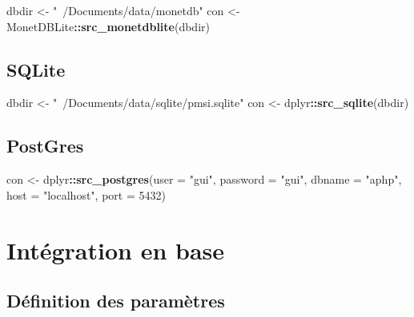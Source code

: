 \documentclass[]{book}
\newenvironment{Shaded}{\begin{snugshade}}{\end{snugshade}}
\newcommand{\KeywordTok}[1]{\textcolor[rgb]{0.13,0.29,0.53}{\textbf{#1}}}
\newcommand{\DataTypeTok}[1]{\textcolor[rgb]{0.13,0.29,0.53}{#1}}
\newcommand{\DecValTok}[1]{\textcolor[rgb]{0.00,0.00,0.81}{#1}}
\newcommand{\StringTok}[1]{\textcolor[rgb]{0.31,0.60,0.02}{#1}}
\newcommand{\OperatorTok}[1]{\textcolor[rgb]{0.81,0.36,0.00}{\textbf{#1}}}
\newcommand{\NormalTok}[1]{#1}
\theoremstyle{definition}
\theoremstyle{definition}
\theoremstyle{definition}
\theoremstyle{remark}
\begin{document}
\begin{Shaded}
\begin{Highlighting}[]
\NormalTok{dbdir <-}\StringTok{ "~/Documents/data/monetdb"}
\NormalTok{con <-}\StringTok{ }\NormalTok{MonetDBLite}\OperatorTok{::}\KeywordTok{src_monetdblite}\NormalTok{(dbdir)}
\end{Highlighting}
\end{Shaded}

\subsection{SQLite}\label{sqlite}

\begin{Shaded}
\begin{Highlighting}[]
\NormalTok{dbdir <-}\StringTok{ "~/Documents/data/sqlite/pmsi.sqlite"}
\NormalTok{con <-}\StringTok{ }\NormalTok{dplyr}\OperatorTok{::}\KeywordTok{src_sqlite}\NormalTok{(dbdir)}
\end{Highlighting}
\end{Shaded}

\subsection{PostGres}\label{postgres}

\begin{Shaded}
\begin{Highlighting}[]
\NormalTok{con <-}\StringTok{ }\NormalTok{dplyr}\OperatorTok{::}\KeywordTok{src_postgres}\NormalTok{(}\DataTypeTok{user =} \StringTok{"gui"}\NormalTok{, }\DataTypeTok{password =} \StringTok{"gui"}\NormalTok{, }\DataTypeTok{dbname =} \StringTok{"aphp"}\NormalTok{,}
                    \DataTypeTok{host =} \StringTok{"localhost"}\NormalTok{, }\DataTypeTok{port =} \DecValTok{5432}\NormalTok{)}
\end{Highlighting}
\end{Shaded}

\section{Intégration en base}\label{integration-en-base}

\subsection{Définition des paramètres}\label{definition-des-parametres}
\end{document}
